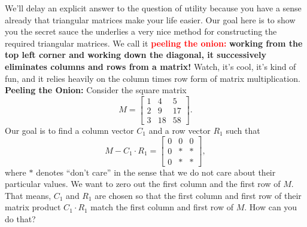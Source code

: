 We'll delay an explicit answer to the question of utility because you have a sense already that triangular matrices make your life easier. Our goal here is to show you the secret sauce the underlies a very nice method for constructing the required triangular matrices. We call it \textcolor{red}{\bf peeling the onion:} \textbf{working from the top left corner and working down the diagonal, it successively eliminates columns and rows from a matrix!} Watch, it's cool, it's kind of fun, and it relies heavily on the column times row form of matrix multiplication. \\

\textbf{Peeling the Onion:} Consider the square matrix 
$$M=\left[\begin{array}{rrr} 
    1   &  4   &  5 \\
     2  &   9  &  17 \\
     3  &  18  &  58 \end{array}  \right]. $$
Our goal is to find a column vector $C_1$ and a row vector $R_1$ such that  $$M-C_1 \cdot R_1 = \left[\begin{array}{rrr} 
    0  &  0   &  0 \\
     0  &   \ast &  \ast \\
    0  &  \ast  &  \ast \end{array}  \right], $$   
where $\ast$ denotes ``don't care'' in the sense that we do not care about their particular values. We want to zero out the first column and the first row of $M$. That means, $C_1$ and $R_1$ are chosen so that the first column and first row of their matrix product $C_1 \cdot R_1$ match the first column and first row of $M$. How can you do that?\\

